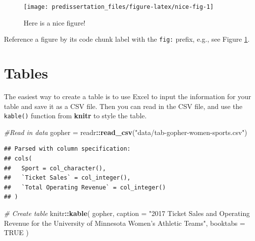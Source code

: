 \documentclass[12pt,letterpaper,oneside,oldfontcommands]{memoir}
\newenvironment{Shaded}{\begin{snugshade}}{\end{snugshade}}
\newcommand{\CommentTok}[1]{\textcolor[rgb]{0.56,0.35,0.01}{\textit{#1}}}
\newcommand{\DataTypeTok}[1]{\textcolor[rgb]{0.13,0.29,0.53}{#1}}
\newcommand{\KeywordTok}[1]{\textcolor[rgb]{0.13,0.29,0.53}{\textbf{#1}}}
\newcommand{\NormalTok}[1]{#1}
\newcommand{\OperatorTok}[1]{\textcolor[rgb]{0.81,0.36,0.00}{\textbf{#1}}}
\newcommand{\OtherTok}[1]{\textcolor[rgb]{0.56,0.35,0.01}{#1}}
\newcommand{\StringTok}[1]{\textcolor[rgb]{0.31,0.60,0.02}{#1}}
\theoremstyle{definition}
\theoremstyle{definition}
\theoremstyle{definition}
\theoremstyle{remark}
\begin{document}
\begin{figure}[H]

{\centering \texttt{[image: predissertation\_files/figure-latex/nice-fig-1]} 

}

\caption{Here is a nice figure!}\label{fig:nice-fig}
\end{figure}

Reference a figure by its code chunk label with the \texttt{fig:}
prefix, e.g., see Figure \ref{fig:nice-fig}.

\hypertarget{tables}{%
\section{Tables}\label{tables}}

The easiest way to create a table is to use Excel to input the
information for your table and save it as a CSV file. Then you can read
in the CSV file, and use the \texttt{kable()} function from
\textbf{knitr} to style the table.

\begin{Shaded}
\begin{Highlighting}[]
\CommentTok{#Read in data}
\NormalTok{gopher =}\StringTok{ }\NormalTok{readr}\OperatorTok{::}\KeywordTok{read_csv}\NormalTok{(}\StringTok{"data/tab-gopher-women-sports.csv"}\NormalTok{)}
\end{Highlighting}
\end{Shaded}

\begin{verbatim}
## Parsed with column specification:
## cols(
##   Sport = col_character(),
##   `Ticket Sales` = col_integer(),
##   `Total Operating Revenue` = col_integer()
## )
\end{verbatim}

\begin{Shaded}
\begin{Highlighting}[]
\CommentTok{# Create table}
\NormalTok{knitr}\OperatorTok{::}\KeywordTok{kable}\NormalTok{(}
\NormalTok{  gopher, }
  \DataTypeTok{caption =} \StringTok{"2017 Ticket Sales and Operating Revenue for the University of Minnesota Women's Athletic Teams"}\NormalTok{,}
  \DataTypeTok{booktabs =} \OtherTok{TRUE}
\NormalTok{)}
\end{Highlighting}
\end{Shaded}
\end{document}
